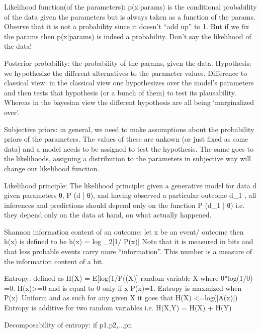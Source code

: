 Likelihood function(of the parameters): p(x|params) is the conditional probability of the data given the parameters but is always taken as a function of the params. Observe that it is not a probability since it doesn't “add up” to 1. But if we fix the params then p(x|params) is indeed a probability. 
Don’t say the likelihood of the data!

Posterior probability: the probability of the params, given the data.
Hypothesis: we hypothesize the different alternatives to the parameter values. 
Difference to classical view: in the classical view one hypothesizes over the model’s parameters and then tests that hypothesis (or a bunch of them) to test its plausability. Whereas in the bayesian view the different hypothesis are all being ‘marginalized over’.

Subjective priors: in general, we need to make assumptions about the probability priors of the parameters. The values of these are unkown (or just fixed as some data) and a model needs to be assigned to test the hypothesis. The same goes to the likelihoods, assigning a distribution to the parameters in subjective way will change our likelihood function.

Likelihood principle: The likelihood principle: given a generative model for data d given parameters θ, P (d | θ), and having observed a particular outcome d_1 , all inferences and predictions should depend only on the function P (d_1 | θ) i.e. they depend only on the data at hand, on what actually happened. 

Shannon information content of an outcome: let x be an event/ outcome then h(x) is defined to be h(x) = log _2[1/ P(x)]
Note that it is measured in bits and that less probable events carry more “information”.
This number is a measure of the information content of a bit. 

Entropy: defined as H(X) =  E[log(1/P((X)] random variable X where 0*log(1/0) =0. H(x)>=0 and is equal to 0 only if x P(x)=1. 
Entropy is maxmized when P(x)~Uniform and as such for any given X it goes that H(X) <=log(|A(x)|)
Entropy is additive for two random variables i.e. H(X,Y) = H(X) + H(Y)

Decomposability of entropy:  if {p1,p2,..,pn}


